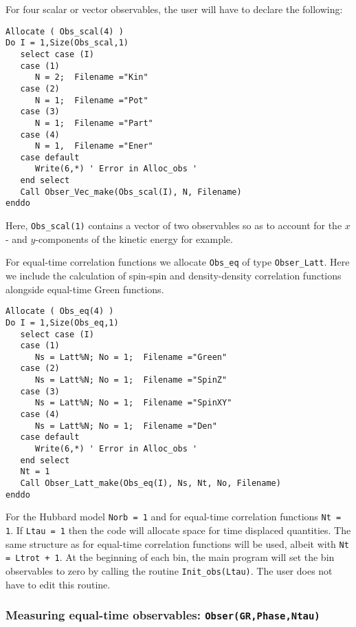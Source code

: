 For  four scalar  or vector observables,  the user will have to  declare the following: 
\begin{lstlisting}[style=fortran]
Allocate ( Obs_scal(4) )
Do I = 1,Size(Obs_scal,1)
   select case (I)
   case (1)
      N = 2;  Filename ="Kin"
   case (2)
      N = 1;  Filename ="Pot"
   case (3)
      N = 1;  Filename ="Part"
   case (4)
      N = 1,  Filename ="Ener"
   case default
      Write(6,*) ' Error in Alloc_obs '  
   end select
   Call Obser_Vec_make(Obs_scal(I), N, Filename)
enddo
\end{lstlisting}
Here,   \texttt{Obs\_scal(1)}   contains a vector  of two observables  so as to account for the $x$- and $y$-components of the kinetic energy for example.  

For equal-time correlation functions  we allocate  \texttt{Obs\_eq}  of type \texttt{Obser\_Latt}.  Here we include the calculation of spin-spin and density-density correlation functions alongside equal-time Green functions. 
\begin{lstlisting}[style=fortran]
Allocate ( Obs_eq(4) )
Do I = 1,Size(Obs_eq,1)
   select case (I)
   case (1)
      Ns = Latt%N; No = 1;  Filename ="Green"
   case (2)
      Ns = Latt%N; No = 1;  Filename ="SpinZ"
   case (3)
      Ns = Latt%N; No = 1;  Filename ="SpinXY"
   case (4)
      Ns = Latt%N; No = 1;  Filename ="Den"
   case default
      Write(6,*) ' Error in Alloc_obs '  
   end select
   Nt = 1
   Call Obser_Latt_make(Obs_eq(I), Ns, Nt, No, Filename)
enddo
\end{lstlisting} 
 For the Hubbard model \texttt{Norb = 1} and for   equal-time correlation functions   \texttt{Nt = 1}.       If  \texttt{Ltau = 1}  then the code will allocate space for  time displaced quantities.   The same structure as for  equal-time correlation functions will be used, albeit with  \texttt{Nt = Ltrot + 1}.  At the beginning of each bin, the main program will set the bin observables to zero by calling  the routine 
 \texttt{Init\_obs(Ltau)}.   The user does not have to edit this routine. 
 
\subsubsection{Measuring equal-time observables: \texttt{Obser(GR,Phase,Ntau)}} \label{sec:EqualTimeobs}

